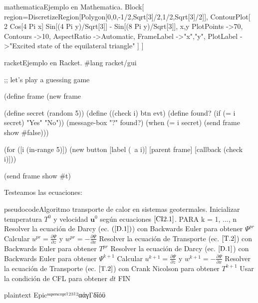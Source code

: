 \begin{sourcecode}{mathematica}{Ejemplo en Mathematica.}
Block[
 {region=DiscretizeRegion[Polygon[{{0,0},{-1/2,Sqrt[3]/2},{1/2,Sqrt[3]/2}}]]},
 ContourPlot[
  2 Cos[4 Pi x] Sin[(4 Pi y)/Sqrt[3]] - Sin[(8 Pi y)/Sqrt[3]],
  {x,y} %
  PlotPoints ->70,
  Contours ->10,
  AspectRatio ->Automatic,
  FrameLabel ->{"x","y"},
  PlotLabel ->"Excited state of the equilateral triangle"
 ]
]
\end{sourcecode}

\begin{sourcecode}{racket}{Ejemplo en Racket.}
#lang racket/gui

;; let's play a guessing game

(define frame (new frame%

(define secret (random 5))
(define ((check i) btn evt)
  (define found? (if (= i secret) "Yes" "No"))
  (message-box "?" found?)
  (when (= i secret)
    (send frame show #false)))

(for ([i (in-range 5)])
   (new button%
        [label (~a i)]
        [parent frame]
        [callback (check i)]))

(send frame show #t)
\end{sourcecode}

Testeamos las ecuaciones:


\begin{sourcecode}{pseudocode}{Algoritmo transporte de calor en sistemas geotermales.}
Inicializar temperatura $T^0$ y velocidad $\textbf{u}^0$ según ecuaciones $\coderef{CI2.1}$.
PARA k = 1, ..., n
	Resolver la ecuación de Darcy (ec. $\codeeqref{D.1}$) con Backwards Euler para obtener $\Psi^{pr}$
	Calcular  $u^{pr} = \frac{\partial \Psi}{\partial z}$ y $w^{pr} = -\frac{\partial \Psi}{\partial x}$
	Resolver la ecuación de Transporte (ec. $\coderef{T.2}$) con Backwards Euler para obtener $T^{pr}$
	Resolver la ecuación de Darcy (ec. $\coderef{D.1}$) con Backwards Euler para obtener $\Psi^{k+1}$
	Calcular $u^{k+1} = \frac{\partial \Psi}{\partial z}$ y $w^{k+1} = -\frac{\partial \Psi}{\partial x}$
	Resolver la ecuación de Transporte (ec. $\coderef{T.2}$) con Crank Nicolson para obtener $T^{k+1}$
	Usar la condición de CFL para obtener $dt$
FIN
\end{sourcecode}


\begin{sourcecode}{plaintext}{}
Epicˢᵘᵖᵉʳˢᶜʳᶦᵖᵗ¹²³¹²αάγΓδΐόϋ
\end{sourcecode}

